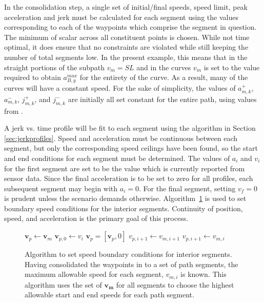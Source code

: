 \documentclass[letterpaper, 10 pt, conference]{ieeeconf}  %
\begin{document}
In the consolidation step, a single set of 
initial/final speeds, speed limit, peak acceleration and jerk 
must be calculated for each segment using the values corresponding to each of the waypoints which comprise the segment in question.
The minimum of scalar across all constituent points is chosen.
While not time optimal, it does ensure that no constraints are violated while still keeping the number of total segments low.
In the present example, this means that in the straight portions of the subpath $v_m = SL$ and in the curves $v_m$ is set to the value required to obtain $a_{B,y}^{max}$ for the entirety of the curve.
As a result, many of the curves will have a constant speed.
For the sake of simplicity, the values of $a^+_{m,k}$, $a^-_{m,k}$, $j^+_{m,k}$, and $j^-_{m,k}$ are initially all set constant for the entire path, using values from \cite{Maurya2012,Hoberock1977,Long2000}.

A jerk vs. time profile will be fit to each segment using the algorithm in Section \ref{sec:jerkprofiles}.
Speed and acceleration must be continuous between each segment, but only the corresponding speed ceilings have been found, so the start and end conditions for each segment must be determined.
The values of $a_i$ and $v_i$ for the first segment are set to be the value which is currently reported from sensor data.
Since the final acceleration is to be set to zero for all profiles, each subsequent segment may begin with $a_i = 0$.
For the final segment, setting $v_f = 0$ is prudent unless the scenario demands otherwise.
Algorithm~\ref{alg:segmentspeedboundaryconditions} is used to set boundary speed conditions for the interior segments. 
Continuity of position, speed, and acceleration is the primary goal of this process.

\begin{figure}
  \begin{algorithmic}[1]
      \State $\mathbf{v}_p \gets \mathbf{v}_m$ 
      \State $\mathbf{v}_{p,0} \gets v_i$ 
      \State $\mathbf{v}_p = [\mathbf{v}_p, 0]$ 
          \State $v_{p,i+1} \gets v_{m,i+1}$
        \Else
          \State $v_{p,i+1} \gets v_{m,i}$
        \EndIf
      \EndFor
    \EndProcedure
  \end{algorithmic}
  \caption{
    Algorithm to set speed boundary conditions for interior segments.
    Having consolidated the waypoints in to a set of path segments, the maximum allowable speed for each segment, $v_{m,i}$ is known.
    This algorithm uses the set of $\mathbf{v_{m}}$ for all segments to choose the highest allowable start and end speeds for each path segment.
  }
\label{alg:segmentspeedboundaryconditions}
\end{figure}
\end{document}
